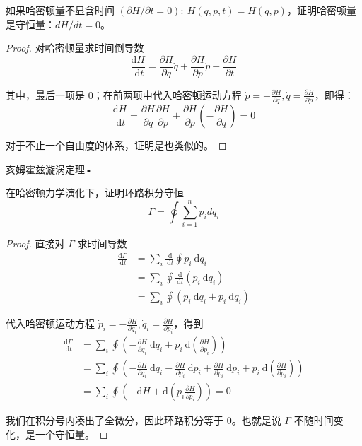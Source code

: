 \begin{3}
    
如果哈密顿量不显含时间 $(\partial H / \partial t=0): ~ H(q, p, t)=H(q, p)$，证明哈密顿量是守恒量：$d H / d t=0$。
\end{3}
\begin{proof}
对哈密顿量求时间倒导数
$$\frac{\mathrm{d} H}{\mathrm{~d} t}=\frac{\partial H}{\partial q} \dot{q}+\frac{\partial H}{\partial p} \dot{p}+\frac{\partial H}{\partial t}$$

其中，最后一项是 $0$；在前两项中代入哈密顿运动方程 $\dot{p}=-\frac{\partial H}{\partial q}, \dot{q}=\frac{\partial H}{\partial p}$，即得：
$$\frac{\mathrm{d} H}{\mathrm{~d} t}
=\frac{\partial H}{\partial q} \frac{\partial H}{\partial p}
+\frac{\partial H}{\partial p}\left(-\frac{\partial H}{\partial q}\right)=0$$

对于不止一个自由度的体系，证明是也类似的。
\end{proof}

\begin{4}
亥姆霍兹漩涡定理•

在哈密顿力学演化下，证明环路积分守恒
$$\Gamma=\oint \sum_{i=1}^n p_i d q_i$$
\end{4}
\begin{proof}
直接对 $\Gamma$ 求时间导数
$$
\begin{aligned}
\frac{\mathrm{d} \Gamma}{\mathrm{~d} t} & =\sum_{i} \frac{\mathrm{~d}}{\mathrm{~d} t} \oint p_{i} \mathrm{~d} q_{i} \\
& =\sum_{i} \oint \frac{\mathrm{~d}}{\mathrm{~d} t}\left(p_{i} \mathrm{~d} q_{i}\right) \\
& =\sum_{i} \oint\left(\dot{p}_{i} \mathrm{~d} q_{i}+p_{i} \mathrm{~d} \dot{q}_{i}\right)
\end{aligned}
$$

代入哈密顿运动方程 $\dot{p}_{i}=-\frac{\partial H}{\partial q_{i}}, \dot{q}_{i}=\frac{\partial H}{\partial p_{i}}$，得到
$$
\begin{aligned}
\frac{\mathrm{d} \Gamma}{\mathrm{~d} t} & =\sum_{i} \oint\left(-\frac{\partial H}{\partial q_{i}} \mathrm{~d} q_{i}+p_{i} \mathrm{~d}\left(\frac{\partial H}{\partial p_{i}}\right)\right) \\
& =\sum_{i} \oint\left(-\frac{\partial H}{\partial q_{i}} \mathrm{~d} q_{i}-\frac{\partial H}{\partial p_{i}} \mathrm{~d} p_{i}+\frac{\partial H}{\partial p_{i}} \mathrm{~d} p_{i}+p_{i} \mathrm{~d}\left(\frac{\partial H}{\partial p_{i}}\right)\right) \\
& =\sum_{i} \oint\left(-\mathrm{d} H+\mathrm{d}\left(p_{i} \frac{\partial H}{\partial p_{i}}\right)\right)=0
\end{aligned}
$$

我们在积分号内凑出了全微分，因此环路积分等于 $0$。也就是说 $\Gamma$ 不随时间变化，是一个守恒量。
\end{proof}

